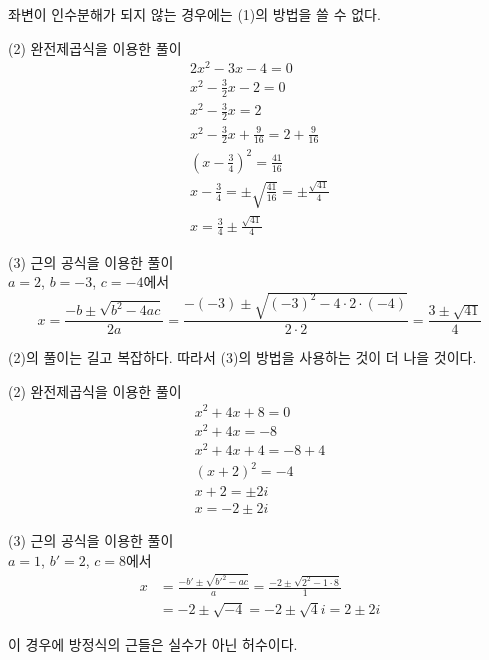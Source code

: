 \documentclass{oblivoir}
\begin{document}
\clearpage

좌변이 인수분해가 되지 않는 경우에는 (1)의 방법을 쓸 수 없다.

%

\begin{mdframed}
(2) 완전제곱식을 이용한 풀이
\begin{gather*}
2x^2-3x-4=0\\
x^2-\frac32x-2=0\\
x^2-\frac32x=2\\
x^2-\frac32x+\frac9{16}=2+\frac9{16}\\
\left(x-\frac34\right)^2=\frac{41}{16}\\
x-\frac34=\pm\sqrt{\frac{41}{16}}=\pm\frac{\sqrt{41}}4\\
x=\frac34\pm\frac{\sqrt{41}}4
\end{gather*}
\end{mdframed}

\begin{mdframed}
(3) 근의 공식을 이용한 풀이\\
\(a=2\), \(b=-3\), \(c=-4\)에서
\[x=\frac{-b\pm\sqrt{b^2-4ac}}{2a}=\frac{-(-3)\pm\sqrt{(-3)^2-4\cdot2\cdot(-4)}}{2\cdot2}=\frac{3\pm\sqrt{41}}{4}\]
\end{mdframed}

(2)의 풀이는 길고 복잡하다.
따라서 (3)의 방법을 사용하는 것이 더 나을 것이다.
\clearpage

%

\begin{mdframed}
(2) 완전제곱식을 이용한 풀이
\begin{gather*}
x^2+4x+8=0\\
x^2+4x=-8\\
x^2+4x+4=-8+4\\
(x+2)^2=-4\\
x+2=\pm2i\\
x=-2\pm2i
\end{gather*}
\end{mdframed}

\begin{mdframed}
(3) 근의 공식을 이용한 풀이\\
\(a=1\), \(b'=2\), \(c=8\)에서
\begin{align*}
x
&=\frac{-b'\pm\sqrt{b'^2-ac}}a=\frac{-2\pm\sqrt{2^2-1\cdot8}}1\\
&=-2\pm\sqrt{-4}=-2\pm\sqrt4i=2\pm2i
\end{align*}
\end{mdframed}
이 경우에 방정식의 근들은 실수가 아닌 허수이다.
\end{document}
